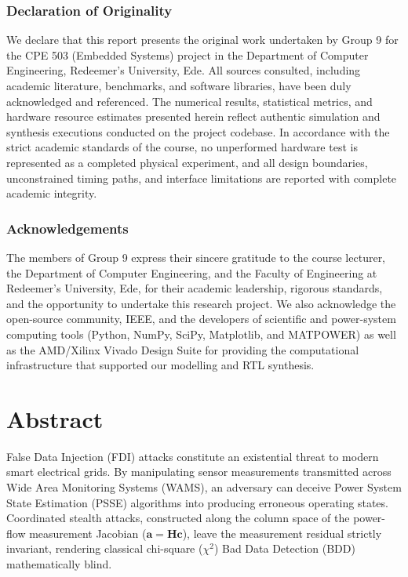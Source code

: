 \documentclass[11pt,a4paper]{report}
\begin{document}
\subsection*{Declaration of Originality}
We declare that this report presents the original work undertaken by Group 9
for the CPE 503 (Embedded Systems) project in the Department of Computer
Engineering, Redeemer's University, Ede. All sources consulted, including
academic literature, benchmarks, and software libraries, have been duly
acknowledged and referenced. The numerical results, statistical metrics,
and hardware resource estimates presented herein reflect authentic simulation
and synthesis executions conducted on the project codebase. In accordance with
the strict academic standards of the course, no unperformed hardware test is
represented as a completed physical experiment, and all design boundaries,
unconstrained timing paths, and interface limitations are reported with complete
academic integrity.

\vspace{0.8cm}
\subsection*{Acknowledgements}
The members of Group 9 express their sincere gratitude to the course
lecturer, the Department of Computer Engineering, and the Faculty of
Engineering at Redeemer's University, Ede, for their academic leadership,
rigorous standards, and the opportunity to undertake this research project.
We also acknowledge the open-source community, IEEE, and the developers of
scientific and power-system computing tools (Python, NumPy, SciPy, Matplotlib,
and MATPOWER) as well as the AMD/Xilinx Vivado Design Suite for providing the
computational infrastructure that supported our modelling and RTL synthesis.

\chapter*{Abstract}
False Data Injection (FDI) attacks constitute an existential threat to
modern smart electrical grids. By manipulating sensor measurements
transmitted across Wide Area Monitoring Systems (WAMS), an adversary can
deceive Power System State Estimation (PSSE) algorithms into producing
erroneous operating states. Coordinated stealth attacks, constructed along
the column space of the power-flow measurement Jacobian ($\boldsymbol{a} = \boldsymbol{H}\boldsymbol{c}$),
leave the measurement residual strictly invariant, rendering classical
chi-square ($\chi^2$) Bad Data Detection (BDD) mathematically blind.
\end{document}
